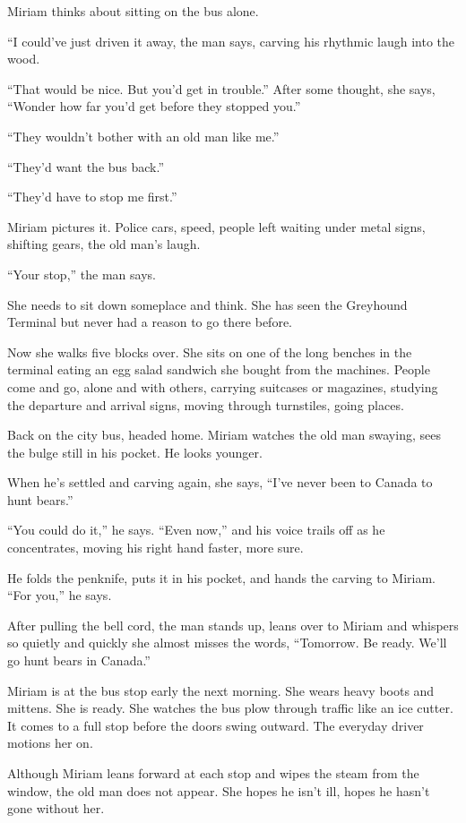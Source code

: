 \documentclass[twoside,10pt]{book}
\begin{document}
Miriam thinks about sitting on the bus alone.

``I could've just driven it away, the man says, carving his rhythmic
laugh into the wood.

``That would be nice. But you'd get in trouble.'' After some thought,
she says, ``Wonder how far you'd get before they stopped you.''

``They wouldn't bother with an old man like me.''

``They'd want the bus back.''

``They'd have to stop me first.''

Miriam pictures it. Police cars, speed, people left waiting under metal
signs, shifting gears, the old man's laugh.

``Your stop,'' the man says.

She needs to sit down someplace and think. She has seen the Greyhound
Terminal but never had a reason to go there before.

Now she walks five blocks over. She sits on one of the long benches in
the terminal eating an egg salad sandwich she bought from the machines.
People come and go, alone and with others, carry­ing suitcases or
magazines, studying the departure and arrival signs, moving through
turnstiles, going places.

Back on the city bus, headed home. Miriam watches the old man swaying,
sees the bulge still in his pocket. He looks younger.

When he's settled and carving again, she says, ``I've never been to
Canada to hunt bears.''

``You could do it,'' he says. ``Even now,'' and his voice trails off as
he concentrates, moving his right hand faster, more sure.

He folds the penknife, puts it in his pocket, and hands the carving to
Miriam. ``For you,'' he says.

After pulling the bell cord, the man stands up, leans over to Miriam and
whispers so quietly and quickly she almost misses the words, ``Tomorrow.
Be ready. We'll go hunt bears in Canada.''

Miriam is at the bus stop early the next morning. She wears heavy boots
and mittens. She is ready. She watches the bus plow through traffic like
an ice cutter. It comes to a full stop before the doors swing outward.
The everyday driver motions her on.

Although Miriam leans forward at each stop and wipes the steam from the
window, the old man does not appear. She hopes he isn't ill, hopes he
hasn't gone without her.
\end{document}

